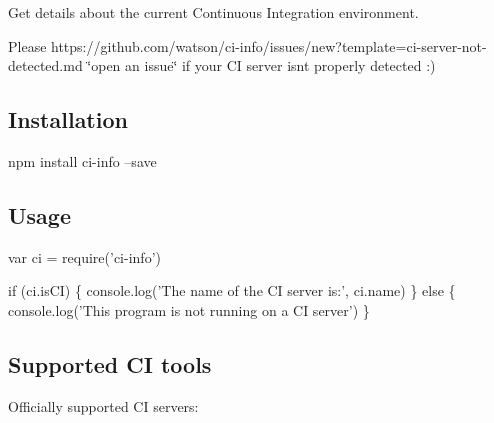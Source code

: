 Get details about the current Continuous Integration environment.

Please https\+://github.com/watson/ci-\/info/issues/new?template=ci-\/server-\/not-\/detected.\+md \char`\"{}open an
issue\char`\"{} if your CI server isn\textquotesingle{}t properly detected \+:)

\href{https://www.npmjs.com/package/ci-info}{\tt } \href{https://travis-ci.org/watson/ci-info}{\tt } \href{https://github.com/feross/standard}{\tt }

\subsection*{Installation}


\begin{DoxyCode}
npm install ci-info --save
\end{DoxyCode}


\subsection*{Usage}


\begin{DoxyCode}
var ci = require('ci-info')

if (ci.isCI) \{
  console.log('The name of the CI server is:', ci.name)
\} else \{
  console.log('This program is not running on a CI server')
\}
\end{DoxyCode}


\subsection*{Supported CI tools}

Officially supported CI servers\+:

